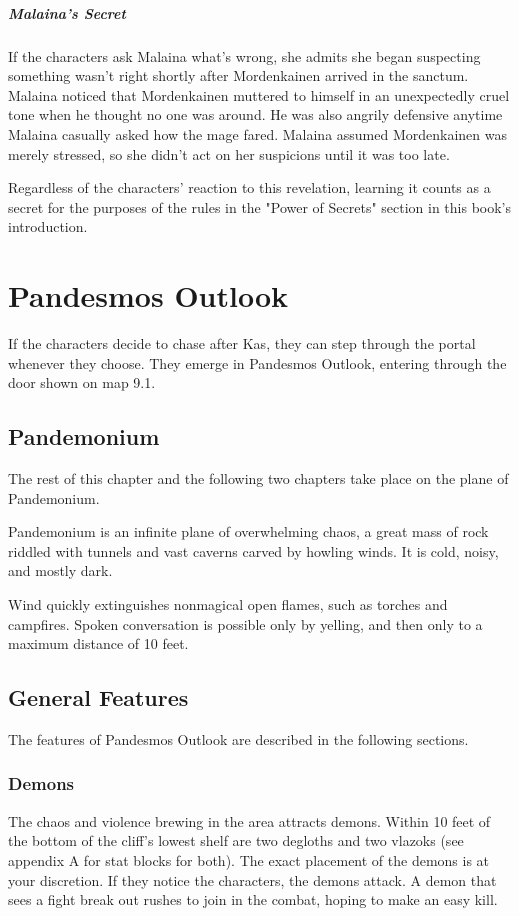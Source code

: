 \documentclass[10pt,a4paper,twoside,bg=print,twocolumn,openany,nodeprecatedcode]{dndbook}
\begin{document}
\subparagraph{Malaina's Secret}
If the characters ask Malaina what's wrong, she admits she began suspecting something wasn't right shortly after Mordenkainen arrived in the sanctum. Malaina noticed that Mordenkainen muttered to himself in an unexpectedly cruel tone when he thought no one was around. He was also angrily defensive anytime Malaina casually asked how the mage fared. Malaina assumed Mordenkainen was merely stressed, so she didn't act on her suspicions until it was too late.

Regardless of the characters' reaction to this revelation, learning it counts as a secret for the purposes of the rules in the "Power of Secrets" section in this book's introduction.

\section{Pandesmos Outlook}
If the characters decide to chase after Kas, they can step through the portal whenever they choose. They emerge in Pandesmos Outlook, entering through the door shown on map 9.1.

\subsection{Pandemonium}
The rest of this chapter and the following two chapters take place on the plane of Pandemonium.

Pandemonium is an infinite plane of overwhelming chaos, a great mass of rock riddled with tunnels and vast caverns carved by howling winds. It is cold, noisy, and mostly dark.

Wind quickly extinguishes nonmagical open flames, such as torches and campfires. Spoken conversation is possible only by yelling, and then only to a maximum distance of 10 feet.

\subsection{General Features}
The features of Pandesmos Outlook are described in the following sections.

\subsubsection{Demons}
The chaos and violence brewing in the area attracts demons. Within 10 feet of the bottom of the cliff's lowest shelf are two degloths and two vlazoks (see appendix A for stat blocks for both). The exact placement of the demons is at your discretion. If they notice the characters, the demons attack. A demon that sees a fight break out rushes to join in the combat, hoping to make an easy kill.
\end{document}
